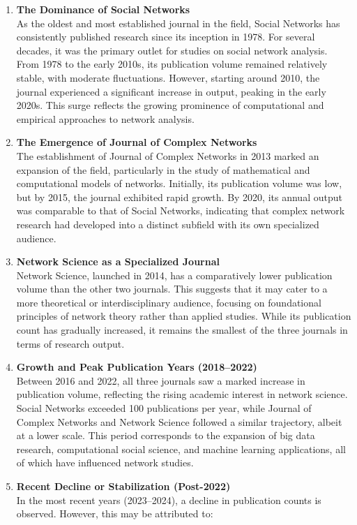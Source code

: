 \documentclass[twocolumn]{article}
\begin{document}
	\begin{enumerate}
		\item \textbf{The Dominance of Social Networks} \\
		As the oldest and most established journal in the field, Social Networks has consistently published research since its inception in 1978. For several decades, it was the primary outlet for studies on social network analysis. From 1978 to the early 2010s, its publication volume remained relatively stable, with moderate fluctuations. However, starting around 2010, the journal experienced a significant increase in output, peaking in the early 2020s. This surge reflects the growing prominence of computational and empirical approaches to network analysis.
		\item 	\textbf{The Emergence of Journal of Complex Networks} \\
		The establishment of Journal of Complex Networks in 2013 marked an expansion of the field, particularly in the study of mathematical and computational models of networks. Initially, its publication volume was low, but by 2015, the journal exhibited rapid growth. By 2020, its annual output was comparable to that of Social Networks, indicating that complex network research had developed into a distinct subfield with its own specialized audience.
		\item 	\textbf{Network Science as a Specialized Journal} \\
		Network Science, launched in 2014, has a comparatively lower publication volume than the other two journals. This suggests that it may cater to a more theoretical or interdisciplinary audience, focusing on foundational principles of network theory rather than applied studies. While its publication count has gradually increased, it remains the smallest of the three journals in terms of research output.
		\item 	\textbf{Growth and Peak Publication Years (2018–2022)} \\
		Between 2016 and 2022, all three journals saw a marked increase in publication volume, reflecting the rising academic interest in network science. Social Networks exceeded 100 publications per year, while Journal of Complex Networks and Network Science followed a similar trajectory, albeit at a lower scale. This period corresponds to the expansion of big data research, computational social science, and machine learning applications, all of which have influenced network studies.
		
		\item \textbf{Recent Decline or Stabilization (Post-2022)} \\
		In the most recent years (2023–2024), a decline in publication counts is observed. However, this may be attributed to:
		

\end{enumerate}
\end{document}
